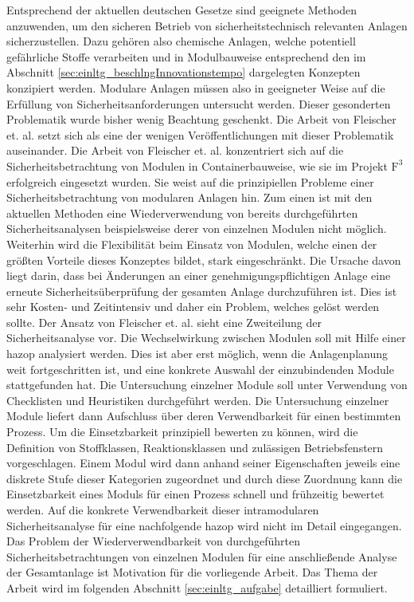 Entsprechend der aktuellen deutschen Gesetze sind geeignete Methoden anzuwenden, um den sicheren Betrieb von sicherheitstechnisch relevanten Anlagen sicherzustellen. Dazu geh\"oren also chemische Anlagen, welche potentiell gef\"ahrliche Stoffe verarbeiten und in Modulbauweise entsprechend den im Abschnitt \ref{sec:einltg_beschlngInnovationstempo} dargelegten Konzepten konzipiert werden. Modulare Anlagen m\"ussen also in geeigneter Weise auf die Erf\"ullung von Sicherheitsanforderungen untersucht werden. Dieser gesonderten Problematik wurde bisher wenig Beachtung geschenkt. Die Arbeit von Fleischer et. al. \cite{Fleischer_2015} setzt sich als eine der wenigen Ver\"offentlichungen mit dieser Problematik auseinander. Die Arbeit von Fleischer et. al. konzentriert sich auf die Sicherheitsbetrachtung von Modulen in Containerbauweise, wie sie im Projekt $\text{F}^{3}$ erfolgreich eingesetzt wurden. Sie weist auf die prinzipiellen Probleme einer Sicherheitsbetrachtung von modularen Anlagen hin. Zum einen ist mit den aktuellen Methoden eine Wiederverwendung von bereits durchgef\"uhrten Sicherheitsanalysen beispielsweise derer von einzelnen Modulen nicht m\"oglich. Weiterhin wird die Flexibilit\"at beim Einsatz von Modulen, welche einen der gr\"o\ss{}ten Vorteile dieses Konzeptes bildet, stark eingeschr\"ankt. Die Ursache davon liegt darin, dass bei \"Anderungen an einer genehmigungspflichtigen Anlage eine erneute Sicherheits\"uberpr\"ufung der gesamten Anlage durchzuf\"uhren ist. Dies ist sehr Kosten- und Zeitintensiv und daher ein Problem, welches gel\"ost werden sollte. \linebreak
Der Ansatz von Fleischer et. al. sieht eine Zweiteilung der Sicherheitsanalyse vor. Die Wechselwirkung zwischen Modulen soll mit Hilfe einer \ac{hazop} analysiert werden. Dies ist aber erst m\"oglich, wenn die Anlagenplanung weit fortgeschritten ist, und eine konkrete Auswahl der einzubindenden Module stattgefunden hat. Die Untersuchung einzelner Module soll unter Verwendung von Checklisten und Heuristiken durchgef\"uhrt werden. Die Untersuchung einzelner Module liefert dann Aufschluss \"uber deren Verwendbarkeit f\"ur einen bestimmten Prozess. Um die Einsetzbarkeit prinzipiell bewerten zu k\"onnen, wird die Definition von Stoffklassen, Reaktionsklassen und zul\"assigen Betriebsfenstern vorgeschlagen. Einem Modul wird dann anhand seiner Eigenschaften jeweils eine diskrete Stufe dieser Kategorien zugeordnet und durch diese Zuordnung kann die Einsetzbarkeit eines Moduls f\"ur einen Prozess schnell und fr\"uhzeitig bewertet werden. Auf die konkrete Verwendbarkeit dieser intramodularen Sicherheitsanalyse f\"ur eine nachfolgende \ac{hazop} wird nicht im Detail eingegangen. Das Problem der Wiederverwendbarkeit von durchgef\"uhrten Sicherheitsbetrachtungen von einzelnen Modulen f\"ur eine anschlie\ss{}ende Analyse der Gesamtanlage ist Motivation f\"ur die vorliegende Arbeit. Das Thema der Arbeit wird im folgenden Abschnitt \ref{sec:einltg_aufgabe} detailliert formuliert.

